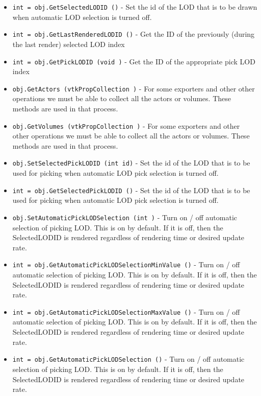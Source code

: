 \begin{itemize}
\item  \verb|int = obj.GetSelectedLODID ()| -  Set the id of the LOD that is to be drawn when automatic LOD selection
 is turned off.

\item  \verb|int = obj.GetLastRenderedLODID ()| -  Get the ID of the previously (during the last render) selected LOD index

\item  \verb|int = obj.GetPickLODID (void )| -  Get the ID of the appropriate pick LOD index

\item  \verb|obj.GetActors (vtkPropCollection )| -  For some exporters and other other operations we must be
 able to collect all the actors or volumes. These methods
 are used in that process.

\item  \verb|obj.GetVolumes (vtkPropCollection )| -  For some exporters and other other operations we must be
 able to collect all the actors or volumes. These methods
 are used in that process.

\item  \verb|obj.SetSelectedPickLODID (int id)| -  Set the id of the LOD that is to be used for picking when  automatic 
 LOD pick selection is turned off.

\item  \verb|int = obj.GetSelectedPickLODID ()| -  Set the id of the LOD that is to be used for picking when  automatic 
 LOD pick selection is turned off.

\item  \verb|obj.SetAutomaticPickLODSelection (int )| -  Turn on / off automatic selection of picking LOD. 
 This is on by default. If it is off, then the SelectedLODID is 
 rendered regardless of rendering time or desired update rate. 

\item  \verb|int = obj.GetAutomaticPickLODSelectionMinValue ()| -  Turn on / off automatic selection of picking LOD. 
 This is on by default. If it is off, then the SelectedLODID is 
 rendered regardless of rendering time or desired update rate. 

\item  \verb|int = obj.GetAutomaticPickLODSelectionMaxValue ()| -  Turn on / off automatic selection of picking LOD. 
 This is on by default. If it is off, then the SelectedLODID is 
 rendered regardless of rendering time or desired update rate. 

\item  \verb|int = obj.GetAutomaticPickLODSelection ()| -  Turn on / off automatic selection of picking LOD. 
 This is on by default. If it is off, then the SelectedLODID is 
 rendered regardless of rendering time or desired update rate. 


\end{itemize}
